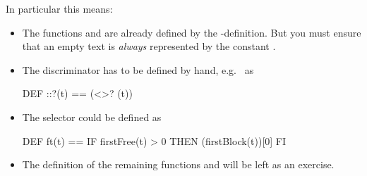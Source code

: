 In particular this means:
\begin{itemize}
\item The functions \pro{<>} and  are already defined by the
  -definition. But you must ensure that an empty text is {\em
    always\/} represented by the constant \pro{<>}.
\item The discriminator  has to be defined by hand, e.g.~ as
  \begin{prog}
    DEF ::?(t) == {\raisebox{-1ex}{\Large \tt~}}(<>? (t))
  \end{prog}
\item The selector  could be defined as
  \begin{prog}
    DEF ft(t) == IF firstFree(t) > 0 THEN (firstBlock(t))[0] FI
  \end{prog}
\item The definition of the remaining functions \pro{::} and 
  will be left as an exercise.
\end{itemize}



